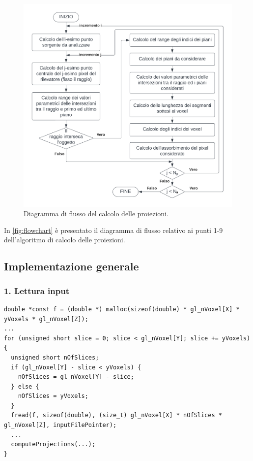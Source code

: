 \documentclass[12pt,a4paper]{report}
\begin{document}
\begin{figure}[H]
  \centering
  \includegraphics[width=\textwidth]{flowchart}
  \caption{Diagramma di flusso del calcolo delle proiezioni.}
  \label{fig:flowchart}
\end{figure}

In \autoref{fig:flowchart} è presentato il diagramma di flusso relativo ai punti 1-9 dell'algoritmo di calcolo delle proiezioni.

\subsection{Implementazione generale}

\subsubsection{1. Lettura input}

\begin{lstlisting}[language=CStyle, caption={Codice C per la lettura di \(f\).}, label={lst:vector_f_read}]
double *const f = (double *) malloc(sizeof(double) * gl_nVoxel[X] * yVoxels * gl_nVoxel[Z]);
...
for (unsigned short slice = 0; slice < gl_nVoxel[Y]; slice += yVoxels) {
  unsigned short nOfSlices;
  if (gl_nVoxel[Y] - slice < yVoxels) {
    nOfSlices = gl_nVoxel[Y] - slice;
  } else {
    nOfSlices = yVoxels;
  }
  fread(f, sizeof(double), (size_t) gl_nVoxel[X] * nOfSlices * gl_nVoxel[Z], inputFilePointer);
  ...
  computeProjections(...);
}
\end{lstlisting}
\end{document}
